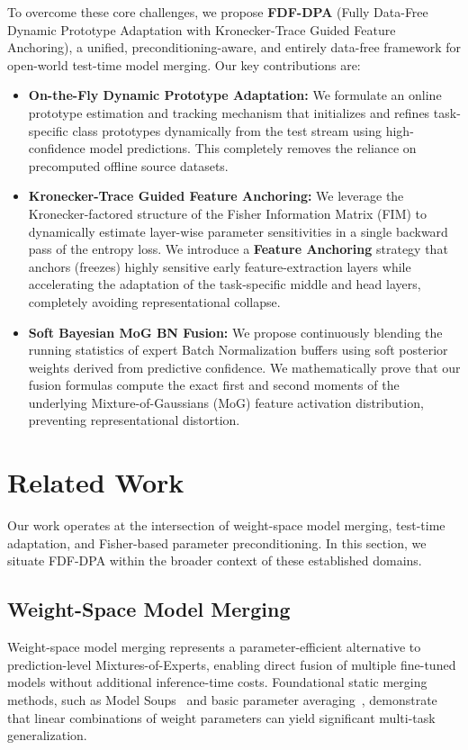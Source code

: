 \documentclass{article}
\theoremstyle{plain}
\theoremstyle{definition}
\theoremstyle{remark}
\begin{document}
To overcome these core challenges, we propose \textbf{FDF-DPA} (Fully Data-Free Dynamic Prototype Adaptation with Kronecker-Trace Guided Feature Anchoring), a unified, preconditioning-aware, and entirely data-free framework for open-world test-time model merging.
Our key contributions are:
\begin{itemize}
    \item \textbf{On-the-Fly Dynamic Prototype Adaptation:} We formulate an online prototype estimation and tracking mechanism that initializes and refines task-specific class prototypes dynamically from the test stream using high-confidence model predictions. This completely removes the reliance on precomputed offline source datasets.
    \item \textbf{Kronecker-Trace Guided Feature Anchoring:} We leverage the Kronecker-factored structure of the Fisher Information Matrix (FIM) to dynamically estimate layer-wise parameter sensitivities in a single backward pass of the entropy loss. We introduce a \textbf{Feature Anchoring} strategy that anchors (freezes) highly sensitive early feature-extraction layers while accelerating the adaptation of the task-specific middle and head layers, completely avoiding representational collapse.
    \item \textbf{Soft Bayesian MoG BN Fusion:} We propose continuously blending the running statistics of expert Batch Normalization buffers using soft posterior weights derived from predictive confidence. We mathematically prove that our fusion formulas compute the exact first and second moments of the underlying Mixture-of-Gaussians (MoG) feature activation distribution, preventing representational distortion.
\end{itemize}

\section{Related Work}
\label{sec:related}

Our work operates at the intersection of weight-space model merging, test-time adaptation, and Fisher-based parameter preconditioning. In this section, we situate FDF-DPA within the broader context of these established domains.

\subsection{Weight-Space Model Merging}
Weight-space model merging represents a parameter-efficient alternative to prediction-level Mixtures-of-Experts, enabling direct fusion of multiple fine-tuned models without additional inference-time costs. Foundational static merging methods, such as Model Soups~\cite{Wortsman2022} and basic parameter averaging~\cite{Matena2022}, demonstrate that linear combinations of weight parameters can yield significant multi-task generalization. 
\end{document}

